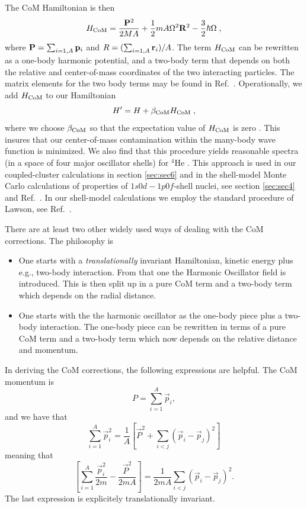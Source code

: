 \documentclass{article}
\begin{document}
The CoM Hamiltonian is then
\begin{equation}
H_{\rm CoM} = \frac{{\bf P}^2}{2MA} 
+\frac{1}{2}mA\Omega^2{\bf R}^2 - \frac{3}{2}\hbar\Omega \;,
\end{equation}
where ${\bf P}=\sum_{i=1,A}{\bf p}_i$ and $R=(\sum_{i=1,A}{\bf r}_i)/A$. 
The term $H_{\rm CoM}$ can be rewritten as a one-body harmonic potential, and a
two-body term that depends on both the relative and center-of-mass 
coordinates of the two interacting particles. The matrix elements for
the two body terms may be found in Ref.~\cite{lawson}. Operationally, 
we add $H_{\rm CoM}$ to our Hamiltonian 
\begin{equation}
H' = H+\beta_{\rm CoM}H_{\rm CoM}\;,
\end{equation}
where we choose $\beta_{\rm CoM}$ so that the expectation value of 
$H_{\rm CoM}$ is zero \cite{drhklz99}. This 
insures that our center-of-mass contamination 
within the many-body wave function is minimized. We also find that this
procedure yields reasonable spectra (in a space of four major
oscillator shells) for ${^4}$He \cite{papenbrock03}. 
This approach is used in our coupled-cluster calculations in section \ref{sec:sec6}
and in the shell-model Monte Carlo calculations of properties of $1s0d-1p0f$-shell
nuclei, see section \ref{sec:sec4} and Ref.~\cite{drhklz99}. In our shell-model
calculations we employ the standard procedure of Lawson, see Ref.~\cite{lawson}.


There are at least two other widely used ways of dealing with the CoM corrections.
The philosophy is
\begin{itemize} 
   \item One starts with a {\em translationally} invariant Hamiltonian,
         kinetic energy plus e.g., two-body interaction.
         From that one the Harmonic Oscillator field is introduced.
         This is then split up in a pure CoM term and a two-body term
         which depends on the radial distance.
   \item One starts with the the harmonic oscillator as the one-body piece
         plus a two-body interaction. The one-body piece can be rewritten 
         in terms of a pure CoM term and a two-body term which now
         depends on the relative distance and momentum. 
\end{itemize}

In deriving the CoM corrections, the following expressions are helpful.
The CoM momentum is
\begin{equation}
   P=\sum_{i=1}^A\vec{p}_i,
\end{equation}
and we have that
\begin{equation}
\sum_{i=1}^A\vec{p}_i^2 =
\frac{1}{A}\left[\vec{P}^2+\sum_{i<j}(\vec{p}_i-\vec{p}_j)^2\right]
\end{equation}
meaning that
\begin{equation}
\left[\sum_{i=1}^A\frac{\vec{p}_i^2}{2m} -\frac{\vec{P}^2}{2mA}\right]
=\frac{1}{2mA}\sum_{i<j}(\vec{p}_i-\vec{p}_j)^2.
\end{equation}
The last expression is explicitely translationally invariant.
\end{document}
